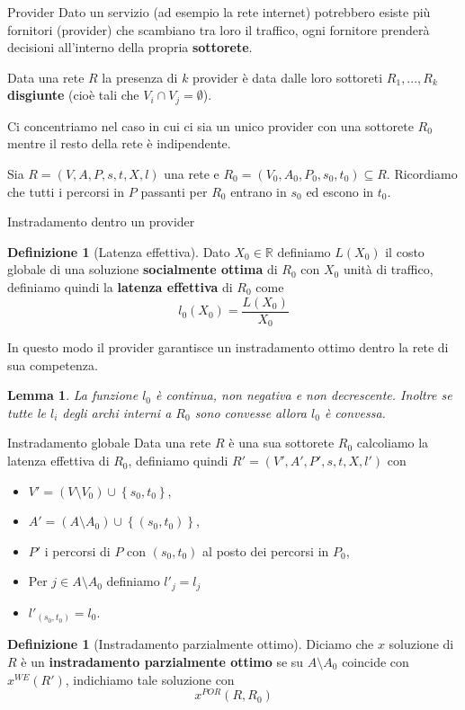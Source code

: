 \documentclass{beamer}
\newcounter{counter1}
\theoremstyle{plain}
\newtheorem{mylem}[counter1]{Lemma}
\theoremstyle{definition}
\newtheorem{mydef}[counter1]{Definizione}
\theoremstyle{remark}
\newcommand{\set}[1]{\left\{#1\right\}}
\newcommand{\pa}[1]{\left(#1\right)}
\begin{document}
\begin{frame}{Provider}
  Dato un servizio (ad esempio la rete internet) potrebbero esiste più
  fornitori (provider) che scambiano tra loro il traffico, ogni
  fornitore prenderà decisioni all'interno della propria
  \textbf{sottorete}.

  Data una rete $R$ la presenza di $k$ provider è data dalle loro
  sottoreti $R_1,...,R_k$ \textbf{disgiunte} (cioè tali che $V_i\cap
  V_j = \emptyset$). \vfill

  Ci concentriamo nel caso in cui ci sia un unico provider con una
  sottorete $R_0$ mentre il resto della rete è indipendente.

  Sia $R=(V,A,P,s,t,X,l)$ una rete e $R_0=(V_0,A_0,P_0,s_0,t_0)
  \subseteq R$. Ricordiamo che tutti i percorsi in $P$ passanti per
  $R_0$ entrano in $s_0$ ed escono in $t_0$.
  \vfill
\end{frame}

\begin{frame}{Instradamento dentro un provider}
  \begin{mydef}[Latenza effettiva]
    Dato $X_0\in\mathbb{R}$ definiamo $L\pa{X_0}$ il costo globale di
    una soluzione \textbf{socialmente ottima} di $R_0$ con $X_0$ unità
    di traffico, definiamo quindi la \textbf{latenza effettiva} di
    $R_0$ come
    \[ l_0(X_0) = \frac{L\pa{X_0}}{X_0} \]
  \end{mydef}
  In questo modo il provider garantisce un instradamento ottimo dentro
  la rete di sua competenza.

  \begin{mylem}
    La funzione $l_0$ è continua, non negativa e non
    decrescente. Inoltre se tutte le $l_i$ degli archi interni a $R_0$
    sono convesse allora $l_0$ è convessa.
  \end{mylem}
\end{frame}

\begin{frame}{Instradamento globale}
  Data una rete $R$ è una sua sottorete $R_0$ calcoliamo la latenza
  effettiva di $R_0$, definiamo quindi $R'=(V',A',P',s,t,X,l')$ con
  \begin{itemize}
  \item $V' = \pa{V\setminus V_0}\cup \set{s_0,t_0}$,
  \item $A' = \pa{A\setminus A_0}\cup \set{\pa{s_0,t_0}}$,
  \item $P'$ i percorsi di $P$ con $\pa{s_0,t_0}$ al posto dei
    percorsi in $P_0$,
  \item Per $j\in A\setminus A_0$ definiamo $l'_j = l_j$
  \item $l'_{\pa{s_0,t_0}} = l_0$.
  \end{itemize}

  \begin{mydef}[Instradamento parzialmente ottimo]
    Diciamo che $x$ soluzione di $R$ è un \textbf{instradamento
      parzialmente ottimo} se su $A\setminus A_0$ coincide con
    $x^{WE}(R')$, indichiamo tale soluzione con
    \[ x^{POR}(R,R_0) \]
  \end{mydef}
\end{frame}
\end{document}
